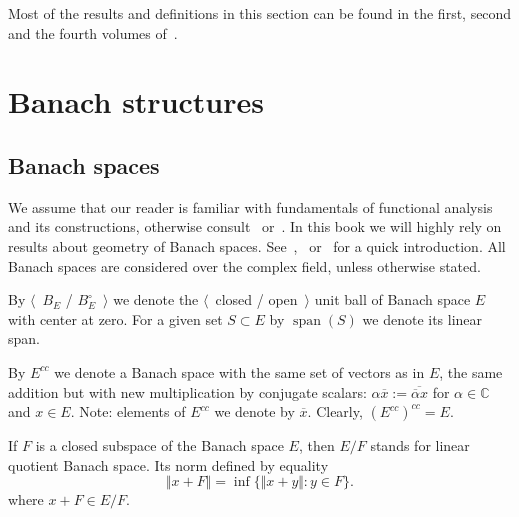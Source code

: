 Most of the results and definitions in this section can be found in the first,
second and the fourth volumes of~\cite{FremMeasTh}.


\section{
  Banach structures
}\label{SectionBanachStructures}


\subsection{
  Banach spaces
}\label{SubSectionBanachSpaces}

We assume that our reader is familiar with fundamentals of functional analysis
and its constructions, otherwise consult~\cite{HelLectAndExOnFuncAn}
or~\cite{ConwACoursInFuncAn}. In this book we will highly rely on results about
geometry of Banach spaces.
See~\cite{CarothShortCourseBanSp},~\cite{KalAlbTopicsBanSpTh}
or~\cite{FabHabBanSpTh} for a quick introduction. All Banach spaces are
considered over the complex field, unless otherwise stated. 

By $\langle$~$B_E$ / $B_E^\circ$~$\rangle$ we denote the $\langle$~closed /
open~$\rangle$ unit ball of Banach space $E$ with center at zero. For a given 
set $S\subset E$ by $\operatorname{span}(S)$ we denote its linear span. 

By $E^{cc}$ we denote a Banach space with the same set of vectors as in $E$, the
same addition but with new multiplication by conjugate scalars:  $\alpha
\overline{x}:=\overline{\overline{\alpha}x}$ for $\alpha\in\mathbb{C}$ 
and $x\in E$. Note: elements of $E^{cc}$ we denote by $\overline{x}$. Clearly,
${(E^{cc})}^{cc}=E$.

If $F$ is a closed subspace of the Banach space $E$, then $E/F$ stands for 
linear quotient Banach space. Its norm defined by equality 
$$
\Vert x+F\Vert=\inf \{\Vert x+y\Vert: y\in F \}.
$$
where $x+F\in E/F$.

